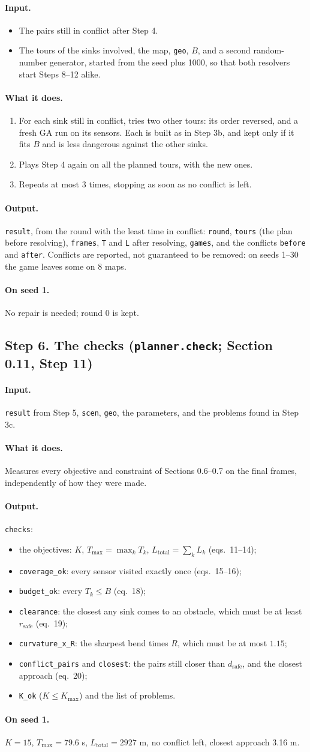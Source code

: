 \documentclass[10pt]{article}
\newcommand{\code}[1]{\texttt{#1}}
\newcommand{\rsafe}{r_{\mathrm{safe}}}
\newcommand{\dsafe}{d_{\mathrm{safe}}}
\newcommand{\Kmax}{K_{\max}}
\newcommand{\inputs}{\paragraph{Input.}}
\newcommand{\does}{\paragraph{What it does.}}
\newcommand{\outputs}{\paragraph{Output.}}
\newcommand{\seedone}{\paragraph{On seed 1.}}
\begin{document}
\inputs
\begin{itemize}
  \item The pairs still in conflict after Step 4.
  \item The tours of the sinks involved, the map, \code{geo}, $B$, and a second random-number generator, started from
    the seed plus 1000, so that both resolvers start Steps 8--12 alike.
\end{itemize}
\does
\begin{enumerate}
  \item For each sink still in conflict, tries two other tours: its order reversed, and a fresh GA run on its sensors.
    Each is built as in Step 3b, and kept only if it fits $B$ and is less dangerous against the other sinks.
  \item Plays Step 4 again on all the planned tours, with the new ones.
  \item Repeats at most 3 times, stopping as soon as no conflict is left.
\end{enumerate}
\outputs \code{result}, from the round with the least time in conflict: \code{round}, \code{tours} (the plan before
resolving), \code{frames}, \code{T} and \code{L} after resolving, \code{games}, and the conflicts \code{before} and
\code{after}. Conflicts are reported, not guaranteed to be removed: on seeds 1--30 the game leaves some on 8 maps.
\seedone No repair is needed; round 0 is kept.

\subsection*{Step 6. The checks (\code{planner.check}; Section 0.11, Step 11)}

\inputs \code{result} from Step 5, \code{scen}, \code{geo}, the parameters, and the problems found in Step 3c.
\does Measures every objective and constraint of Sections 0.6--0.7 on the final frames, independently of how they were
made.
\outputs \code{checks}:
\begin{itemize}
  \item the objectives: $K$, $T_{\max} = \max_k T_k$, $L_{\mathrm{total}} = \sum_k L_k$ (eqs.~11--14);
  \item \code{coverage\_ok}: every sensor visited exactly once (eqs.~15--16);
  \item \code{budget\_ok}: every $T_k \le B$ (eq.~18);
  \item \code{clearance}: the closest any sink comes to an obstacle, which must be at least $\rsafe$ (eq.~19);
  \item \code{curvature\_x\_R}: the sharpest bend times $R$, which must be at most $1.15$;
  \item \code{conflict\_pairs} and \code{closest}: the pairs still closer than $\dsafe$, and the closest approach
    (eq.~20);
  \item \code{K\_ok} ($K \le \Kmax$) and the list of problems.
\end{itemize}
\seedone $K = 15$, $T_{\max} = 79.6$ s, $L_{\mathrm{total}} = 2927$ m, no conflict left, closest approach 3.16 m.
\end{document}
